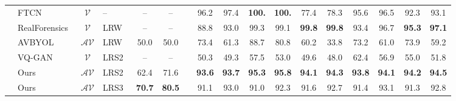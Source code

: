 \documentclass[10pt,twocolumn,letterpaper]{article}
\makeatletter
\def\adl@drawiv#1#2#3{\hskip.5\tabcolsep
        \xleaders#3{#2.5\@tempdimb #1{1}#2.5\@tempdimb}#2\z@ plus1fil minus1fil\relax
        \hskip.5\tabcolsep}
\newcommand{\cdashlinelr}[1]{\noalign{\vskip\aboverulesep
           \global\let\@dashdrawstore\adl@draw
           \global\let\adl@draw\adl@drawiv}
  \cdashline{#1}
  \noalign{\global\let\adl@draw\@dashdrawstore
           \vskip\belowrulesep}}
\makeatother
\begin{document}
\begin{table*}[t!]
{\begin{tabular}{clclccccccccccc:cc}
& FTCN~\cite{zheng2021exploring}                                   &        $\mathcal{V}$                      &          --                                                                     &    --        &   --       &   &   96.2    &      97.4       &    \textbf{100.}          &      \textbf{100.}        &      77.4       &       78.3    &    95.6       &    96.5    & 92.3 &   93.1    \\
& RealForensics~\cite{haliassos2022leveraging}                         &         $\mathcal{V}$                     & LRW~\cite{Chung16}                                                                          &   --        &  --   &  &   88.8      &     93.0          &      99.3       &         99.1    &           \textbf{99.8}     &       \textbf{99.8}      &   93.4          &     96.7  & \textbf{95.3} & \textbf{97.1}       \\
\cmidrule(lr){1-17}
\parbox[t]{4mm}{} 
& AVBYOL~\cite{haliassos2022leveraging,grill2020bootstrap}               &     $\mathcal{A} \mathcal{V}$                                                 & LRW~\cite{Chung16}                                                                         &    50.0        &      50.0 &  & 73.4  &       61.3      &     88.7     &  80.8 &  60.2     &      33.8            &   73.2         & 61.0 & 73.9  & 59.2 \\
& VQ-GAN ~\cite{esser2021taming}                                 &      $\mathcal{V}$                   & LRS2~\cite{Afouras18c}                                                                        & --       &     --  &   &  50.3     &   49.3       & 57.5  &   53.0      &    49.6      &     48.0    &     62.4        &  56.9  &  55.0 & 51.8  \\
\cdashlinelr{2-17}
& Ours                &                 $\mathcal{A} \mathcal{V}$                                  & LRS2~\cite{Afouras18c}                                                                         &      62.4    &  71.6    &    &     \textbf{93.6}         &     \textbf{93.7}    &  \textbf{95.3} &    \textbf{95.8}     &       \textbf{94.1}       &       \textbf{94.3}       &   \textbf{93.8}           & \textbf{94.1}  &\textbf{94.2} & \textbf{94.5}  \\
& Ours                &                 $\mathcal{A} \mathcal{V}$                                  & LRS3~\cite{afouras2018lrs3}        &      \textbf{70.7}      &     \textbf{80.5} &     &     91.1         &    93.0         &   91.0   &  92.3        &   91.6           &      92.7       &   91.4           & 93.1   & 91.3 & 92.8\\ 

\end{tabular}}
\end{table*}
\end{document}
